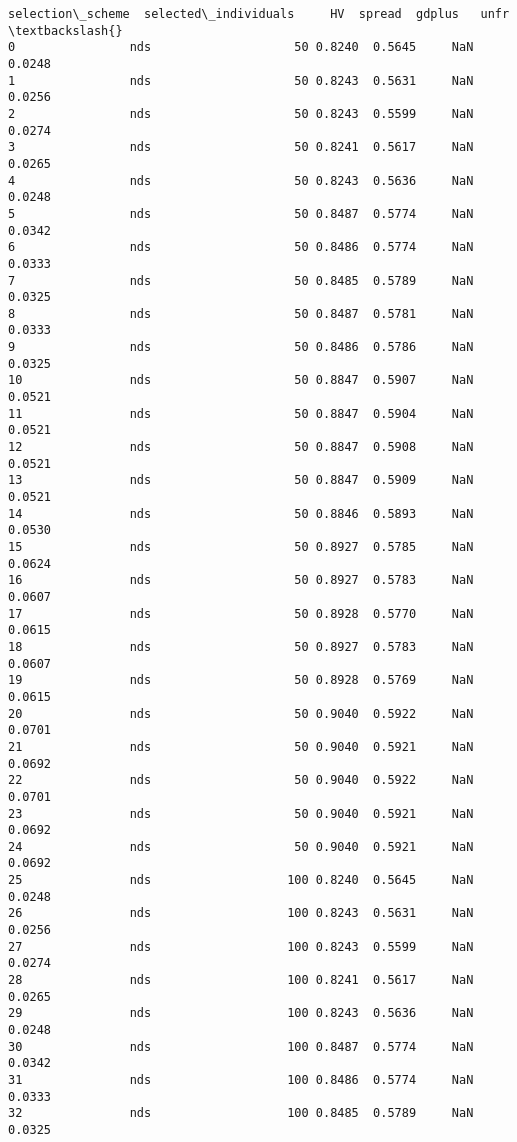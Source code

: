 \documentclass[11pt]{article}
\begin{document}
\begin{Verbatim}[commandchars=\\\{\}]
    selection\_scheme  selected\_individuals     HV  spread  gdplus   unfr  \textbackslash{}
0                nds                    50 0.8240  0.5645     NaN 0.0248   
1                nds                    50 0.8243  0.5631     NaN 0.0256   
2                nds                    50 0.8243  0.5599     NaN 0.0274   
3                nds                    50 0.8241  0.5617     NaN 0.0265   
4                nds                    50 0.8243  0.5636     NaN 0.0248   
5                nds                    50 0.8487  0.5774     NaN 0.0342   
6                nds                    50 0.8486  0.5774     NaN 0.0333   
7                nds                    50 0.8485  0.5789     NaN 0.0325   
8                nds                    50 0.8487  0.5781     NaN 0.0333   
9                nds                    50 0.8486  0.5786     NaN 0.0325   
10               nds                    50 0.8847  0.5907     NaN 0.0521   
11               nds                    50 0.8847  0.5904     NaN 0.0521   
12               nds                    50 0.8847  0.5908     NaN 0.0521   
13               nds                    50 0.8847  0.5909     NaN 0.0521   
14               nds                    50 0.8846  0.5893     NaN 0.0530   
15               nds                    50 0.8927  0.5785     NaN 0.0624   
16               nds                    50 0.8927  0.5783     NaN 0.0607   
17               nds                    50 0.8928  0.5770     NaN 0.0615   
18               nds                    50 0.8927  0.5783     NaN 0.0607   
19               nds                    50 0.8928  0.5769     NaN 0.0615   
20               nds                    50 0.9040  0.5922     NaN 0.0701   
21               nds                    50 0.9040  0.5921     NaN 0.0692   
22               nds                    50 0.9040  0.5922     NaN 0.0701   
23               nds                    50 0.9040  0.5921     NaN 0.0692   
24               nds                    50 0.9040  0.5921     NaN 0.0692   
25               nds                   100 0.8240  0.5645     NaN 0.0248   
26               nds                   100 0.8243  0.5631     NaN 0.0256   
27               nds                   100 0.8243  0.5599     NaN 0.0274   
28               nds                   100 0.8241  0.5617     NaN 0.0265   
29               nds                   100 0.8243  0.5636     NaN 0.0248   
30               nds                   100 0.8487  0.5774     NaN 0.0342   
31               nds                   100 0.8486  0.5774     NaN 0.0333   
32               nds                   100 0.8485  0.5789     NaN 0.0325   

\end{Verbatim}
\end{document}

